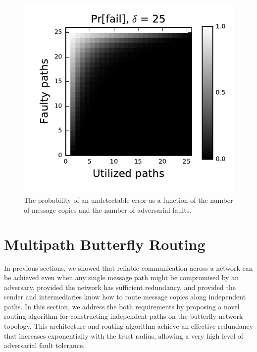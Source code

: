 \documentclass{sig-alternate-05-2015}
\begin{document}
\begin{figure}
\centerline{\includegraphics{fig-perror}}
\caption{
The probability of an undetectable error as a function of the number of
message copies and the number of adversarial faults.
}
\label{fig:pfail}
\end{figure}

\section{Multipath Butterfly Routing}
\label{sec-butterfly}

In previous sections, we showed that reliable communication across a network
can be achieved even when any single message path might be compromised by
an adversary,
provided the network has sufficient redundancy,
and provided the sender and intermediaries know how to route message
copies along independent paths.
In this section, we address the both requirements by proposing a novel routing
algorithm for constructing independent paths on the butterfly network topology.
This architecture and routing algorithm achieve an
effective redundancy that increases exponentially with the trust radius,
allowing a very high level of adversarial fault tolerance.
\end{document}
